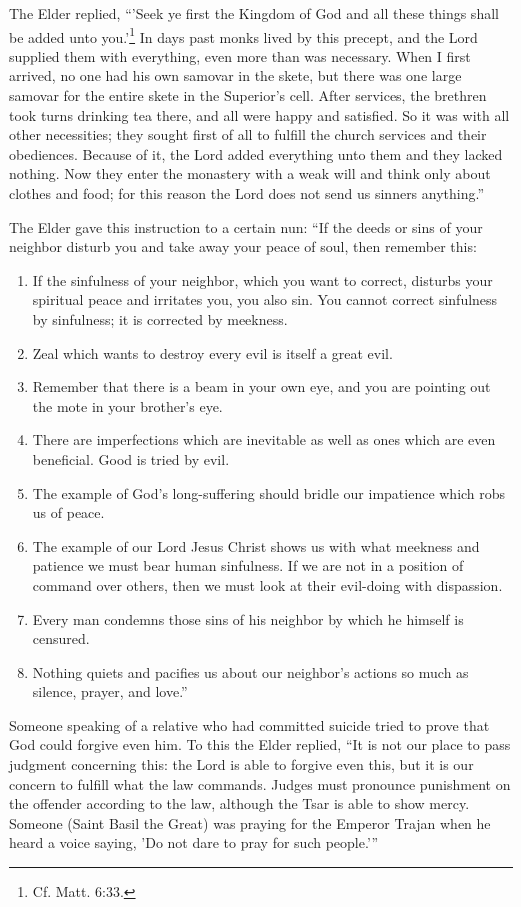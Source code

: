The Elder replied, “'Seek ye first the Kingdom of God and all these things shall be added unto you.'\footnote{Cf. Matt. 6:33.} In days past monks lived by this precept, and the Lord supplied them with everything, even more than was necessary. When I first arrived, no one had his own samovar in the skete, but there was one large samovar for the entire skete in the Superior's cell. After services, the brethren took turns drinking tea there, and all were happy and satisfied. So it was with all other necessities; they sought first of all to fulfill the church services and their obediences. Because of it, the Lord added everything unto them and they lacked nothing. Now they enter the monastery with a weak will and think only about clothes and food; for this reason the Lord does not send us sinners anything.”

The Elder gave this instruction to a certain nun: “If the deeds or sins of your neighbor disturb you and take away your peace of soul, then remember this:

\begin{enumerate}[label=\textit{\alph*}.]
\item If the sinfulness of your neighbor, which you want to correct, disturbs your spiritual peace and irritates you, you also sin. You cannot correct sinfulness by sinfulness; it is corrected by meekness. 
\item Zeal which wants to destroy every evil is itself a great evil.
\item Remember that there is a beam in your own eye, and you are pointing out the mote in your brother's eye.
\item There are imperfections which are inevitable as well as ones which are even beneficial. Good is tried by evil.
\item The example of God's long-suffering should bridle our impatience which robs us of peace.
\item The example of our Lord Jesus Christ shows us with what meekness and patience we must bear human sinfulness. If we are not in a position of command over others, then we must look at their evil-doing with dispassion.
\item Every man condemns those sins of his neighbor by which he himself is censured.
\item Nothing quiets and pacifies us about our neighbor's actions so much as silence, prayer, and love.”
\end{enumerate}

Someone speaking of a relative who had committed suicide tried to prove that God could forgive even him. To this the Elder replied, “It is not our place to pass judgment concerning this: the Lord is able to forgive even this, but it is our concern to fulfill what the law commands. Judges must pronounce punishment on the offender according to the law, although the Tsar is able to show mercy. Someone (Saint Basil the Great) was praying for the Emperor Trajan when he heard a voice saying, 'Do not dare to pray for such people.'”

